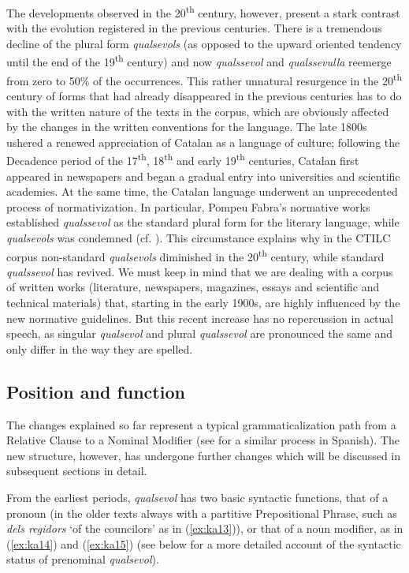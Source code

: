 \documentclass[output=paper,colorlinks,citecolor=brown]{langscibook}
\begin{document}
The developments observed in the 20\textsuperscript{th} century, however, present a stark contrast with the evolution registered in the previous centuries. There is a tremendous decline of the plural form \textit{qualsevols} (as opposed to the upward oriented tendency until the end of the 19\textsuperscript{th} century) and now \textit{qualssevol} and \textit{qualssevulla} reemerge from zero to 50\% of the occurrences. This rather unnatural resurgence in the 20\textsuperscript{th} century of forms that had already disappeared in the previous centuries has to do with the written nature of the texts in the corpus, which are obviously affected by the changes in the written conventions for the language. The late 1800s ushered a renewed appreciation of Catalan as a language of culture; following the Decadence period of the 17\textsuperscript{th}, 18\textsuperscript{th} and early 19\textsuperscript{th} centuries, Catalan first appeared in newspapers and began a gradual entry into universities and scientific academies. At the same time, the Catalan language underwent an unprecedented process of normativization. In particular, Pompeu Fabra’s normative works established \textit{qualssevol} as the standard plural form for the literary language, while \textit{qualsevols} was condemned (cf. \cite[][VI: 889]{Coromines1985}). This circumstance explains why in the CTILC corpus non-standard \textit{qualsevols} diminished in the 20\textsuperscript{th} century, while standard \textit{qualssevol} has revived. We must keep in mind that we are dealing with a corpus of written works (literature, newspapers, magazines, essays and scientific and technical materials) that, starting in the early 1900s, are highly influenced by the new normative guidelines. But this recent increase has no repercussion in actual speech, as singular \textit{qualsevol} and plural \textit{qualssevol} are pronounced the same and only differ in the way they are spelled.

\subsection{Position and function}\label{sec:kea5.3}
The changes explained so far represent a typical grammaticalization path from a Relative Clause to a Nominal Modifier (see \cite{CompanyCompany2009} for a similar process in Spanish). The new structure, however, has undergone further changes which will be discussed in subsequent sections in detail.

From the earliest periods, \textit{qualsevol} has two basic syntactic functions, that of a pronoun (in the older texts always with a partitive Prepositional Phrase, such as \textit{dels regidors} ‘of the councilors’ as in (\ref{ex:ka13})), or that of a noun modifier, as in 
(\ref{ex:ka14}) and (\ref{ex:ka15}) (see  below for a more detailed account of the syntactic status of prenominal \textit{qualsevol}).
\end{document}
